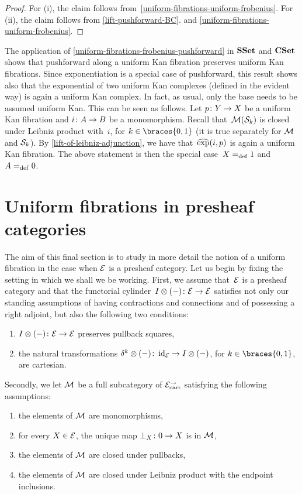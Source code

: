 \documentclass[reqno,10pt,a4paper,oneside,draft]{amsart}
\begin{document}
{{\begin{proof}
For (i), the claim follows from~\cref{uniform-fibrations-uniform-frobenius}. For (ii), the claim follows from \cref{lift-pushforward-BC}.
and \cref{uniform-fibrations-uniform-frobenius}.
\end{proof}


\begin{example} The application of \cref{uniform-fibrations-frobenius-pushforward} in $\SSet$
and $\CSet$ shows that pushforward along a uniform Kan fibration preserves uniform Kan fibrations. 
Since exponentiation is a special case of pushforward, this result shows also that the exponential of two uniform Kan complexes (defined in the evident way) is again a uniform Kan complex.
In fact, as usual, only the base needs to be assumed uniform Kan. This can be seen as follows.
Let $p \co Y \to X$ be a uniform Kan fibration and $i \co A \to B$ be a monomorphism.
Recall that~$\cal{M}(\cal{S}_k)$ is closed under Leibniz product with~$i$, for $k \in \braces{0, 1}$ (it is true separately for $\cal{M}$ and $\cal{S}_k$).
By \cref{lift-of-leibniz-adjunction}, we have that~$\hatexp(i, p)$ is again a uniform Kan fibration.
The above statement is then the special case~$X \defeq 1$ and~$A \defeq 0$.
\end{example} 


\section{Uniform fibrations in presheaf categories}
\label{sec:fib-psh}

The aim of this final section is to study in more detail the notion of a uniform fibration in the case when $\cal{E}$ is a presheaf category.  Let us begin by fixing the setting in which we shall we
be working.  First, we assume that~$\cal{E}$ is a presheaf category and that the functorial cylinder~$\interval \otimes (-) \co \cal{E} \to \cal{E}$ satisfies not only
our standing assumptions of having contractions and connections and of possessing a right adjoint, but also the following two conditions: 
\begin{enumerate}[({C}1)] 
\item $\interval \otimes (-) \co \cal{E} \to \cal{E}$ preserves pullback squares,
\item the natural transformations $\kcyl \otimes (-) \co \id_\cal{E} \to \interval \otimes (-)$, for $k \in \braces{ 0, 1}$, are cartesian.
\end{enumerate} 
Secondly, we let $\cal{M}$ be a full subcategory of $\cal{E}^\to_\cart$ satisfying the following assumptions:
\begin{enumerate}[({M}1)] 
\item the elements of $\cal{M}$ are monomorphisms,
\item for every $X \in \cal{E}$, the unique map $\bot_X \co 0 \to X$ is in $\cal{M}$, 
\item the elements of $\cal{M}$ are closed under pullbacks,
\item the elements of $\cal{M}$ are closed under Leibniz product with the endpoint inclusions.
\end{enumerate} 


}}
\end{document}
